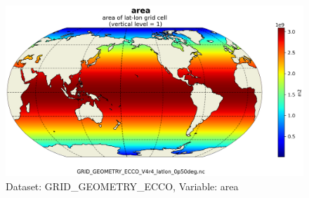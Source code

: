 \begin{figure}[H]
\centering
\includegraphics[scale=0.55]{../images/plots/latlon_plots_coords/Geometry_Parameters_for_the_0.5_degree_Lat-Lon_Model_Grid_(Version_4_Release_4)/area.png}
\caption{Dataset: GRID\_GEOMETRY\_ECCO, Variable: area}
\label{tab:table-GRID_GEOMETRY_ECCO_area-Plot}
\end{figure}
\newpage
\pagebreak
